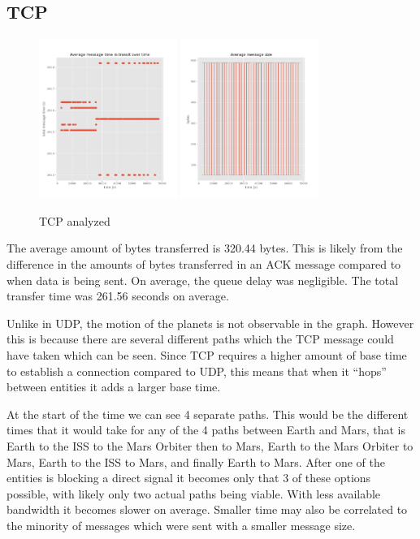 \documentclass[a4paper,12pt]{article}
\begin{document}
\subsection{TCP}

\begin{figure}[h]
  \centering
  \includegraphics[width=0.4\textwidth]{media/tcp.png}
  \includegraphics[width=0.4\textwidth]{media/tcp_data.png}
  \caption{TCP analyzed}
\end{figure}

The average amount of bytes transferred is 320.44 bytes. This is likely from the
difference in the amounts of bytes transferred in an ACK message compared to
when data is being sent. On average, the queue delay was negligible. The total
transfer time was 261.56 seconds on average.

Unlike in UDP, the motion of the planets is not observable in the graph. However
this is because there are several different paths which the TCP message could
have taken which can be seen. Since TCP requires a higher amount of base time to
establish a connection compared to UDP, this means that when it ``hops'' between
entities it adds a larger base time.

At the start of the time we can see 4 separate paths. This would be the
different times that it would take for any of the 4 paths between Earth and
Mars, that is Earth to the ISS to the Mars Orbiter then to Mars, Earth to the
Mars Orbiter to Mars, Earth to the ISS to Mars, and finally Earth to Mars. After
one of the entities is blocking a direct signal it becomes only that 3 of these
options possible, with likely only two actual paths being viable. With less
available bandwidth it becomes slower on average. Smaller time may also be
correlated to the minority of messages which were sent with a smaller message
size.
\end{document}
